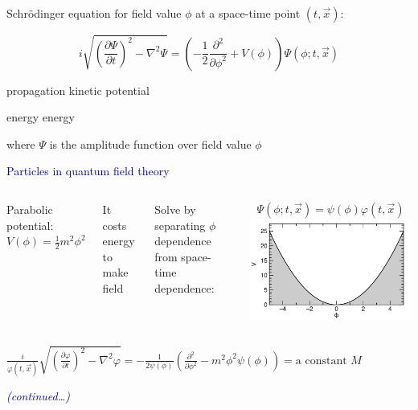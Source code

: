 \documentclass[compress]{beamer}
\begin{document}
\begin{frame}
Schr\"odinger equation for field value $\phi$ at a space-time point $(t, \vec{x})$:

\[ i \sqrt{\left( \frac{\partial \Psi}{\partial t} \right)^2 - \nabla^2 \Psi} = \left( -\frac{1}{2} \frac{\partial^2}{\partial \phi^2} + V(\phi) \right) \Psi(\phi; t, \vec{x}) \]

\vspace{-0.25 cm}
{\scriptsize \hspace{2.4 cm} propagation \hspace{1.1 cm} kinetic \hspace{0.22 cm} potential }

\vspace{-0.2 cm}
{\scriptsize \hspace{5.2 cm} energy \hspace{0.35 cm} energy }

\vspace{0.2 cm}
where $\Psi$ is the amplitude function over field value $\phi$

\vfill
\hspace{-0.83 cm} \textcolor{darkblue}{\Large Particles in quantum field theory}

\begin{columns}

Parabolic potential: $\displaystyle V(\phi) = \frac{1}{2} m^2 \phi^2$

It costs energy to make field

\vspace{0.5 cm}
Solve by separating $\phi$ dependence from space-time dependence:

\vspace{-0.4 cm}
\[ \Psi(\phi; t, \vec{x}) = \psi(\phi) \varphi(t, \vec{x}) \]
\includegraphics[width=\linewidth]{potential_quadratic.png}
\end{columns}

\mbox{$\displaystyle \frac{i}{\varphi(t, \vec{x})} \sqrt{\left( \frac{\partial \varphi}{\partial t} \right)^2 - \nabla^2 \varphi} = -\frac{1}{2\psi(\phi)} \left( \frac{\partial^2}{\partial \phi^2} - m^2 \phi^2 \psi(\phi) \right) = \mbox{a constant } M$\hspace{-1 cm}}

\hfill \textcolor{darkblue}{\scriptsize \it (continued\ldots)}
\end{frame}
\end{document}
